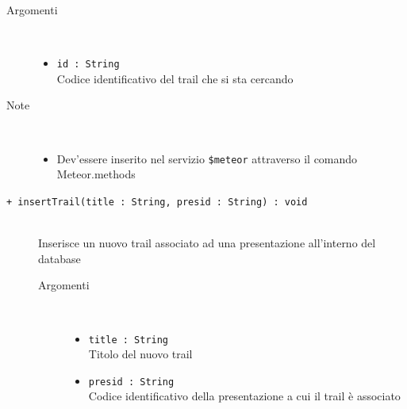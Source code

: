 \begin{description}
\begin{description}
		\begin{description}
			\item[Argomenti] \hfill \\
				\begin{itemize}
				
					\item \texttt{id : String			} \hfill \\
					Codice identificativo del trail che si sta cercando
					
				\end{itemize}
			\item[Note] \hfill \\
			\begin{itemize}
					\item Dev'essere inserito nel servizio \texttt{\$meteor} attraverso il comando Meteor.methods
				\end{itemize}
		\end{description}
	\end{description}
	
	\begin{description}
		\item[\texttt{+ insertTrail(title : String, presid : String) : void			}] \hfill \\
			Inserisce un nuovo trail associato ad una presentazione all'interno del database
			
		\begin{description}
			\item[Argomenti] \hfill \\
				\begin{itemize}
				
					\item \texttt{title : String			} \hfill \\
					Titolo del nuovo trail
					\item \texttt{presid : String			} \hfill \\
					Codice identificativo della presentazione a cui il trail è associato
					

\end{itemize}
\end{description}
\end{description}
\end{description}
